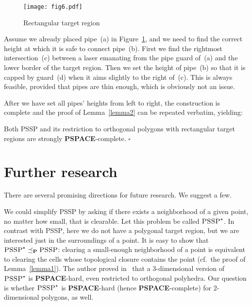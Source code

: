 \documentclass{style}
\newcommand{\complexityclass}[1]{\textbf{#1}}
\newcommand{\computproblem}[1]{\textsc{#1}}
\renewcommand{\P}{\complexityclass{P}\xspace}
\newcommand{\PSPACE}{\complexityclass{PSPACE}\xspace}
\newcommand{\PSSP}{\computproblem{PSSP}\xspace}
\begin{document}
\begin{figure}[h]
\centering
\texttt{[image: fig6.pdf]}
\caption{Rectangular target region}
\label{fig6}
\end{figure}

Assume we already placed pipe~(a) in Figure~\ref{fig6}, and we need to find the correct height at which it is safe to connect pipe~(b). First we find the rightmost intersection~(c) between a laser emanating from the pipe guard of~(a) and the lower border of the target region. Then we set the height of pipe~(b) so that it is capped by guard~(d) when it aims slightly to the right of~(c). This is always feasible, provided that pipes are thin enough, which is obviously not an issue.

After we have set all pipes' heights from left to right, the construction is complete and the proof of Lemma~\ref{lemma2} can be repeated verbatim, yielding:

\begin{theorem}
Both \PSSP and its restriction to orthogonal polygons with rectangular target regions are strongly \PSPACE-complete. \hfill $\square$
\end{theorem}

\section{Further research}

There are several promising directions for future research. We suggest a few.

We could simplify \PSSP by asking if there exists a neighborhood of a given point, no matter how small, that is clearable. Let this problem be called $\PSSP^\star$. In contrast with \PSSP, here we do not have a polygonal target region, but we are interested just in the surroundings of a point. It is easy to show that $\PSSP^\star \preceq_{\P} \PSSP$: clearing a small-enough neighborhood of a point is equivalent to clearing the cells whose topological closure contains the point (cf.~the proof of Lemma~\ref{lemma1}). The author proved in~\cite{thesis} that a 3-dimensional version of $\PSSP^\star$ is \PSPACE-hard, even restricted to orthogonal polyhedra. Our question is whether $\PSSP^\star$ is \PSPACE-hard (hence \PSPACE-complete) for 2-dimensional polygons, as well.
\end{document}
